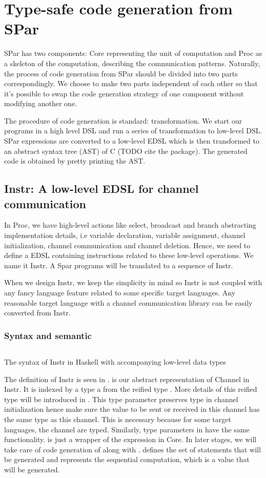 \chapter{Type-safe code generation from SPar} \label{chap:cg}
SPar has two components: Core representing the unit of computation and Proc as a skeleton of the computation, describing the communication patterns. Naturally, the process of code generation from SPar should be divided into two parts correspondingly. We choose to make two parts independent of each other so that it's possible to swap the code generation strategy of one component without modifying another one.

The procedure of code generation is standard: transformation. We start our programs in a high level DSL and run a series of transformation to low-level DSL. SPar expressions are converted to a low-level EDSL which is then transformed to an abstract syntax tree (AST) of C (TODO cite the package). The generated code is obtained by pretty printing the AST.
\section{Instr: A low-level EDSL for channel communication}
In Proc, we have high-level actions like select, broadcast and branch abstracting implementation details, i.e variable declaration, variable assignment, channel initialization, channel communication and channel deletion. Hence, we need to define a EDSL containing instructions related to these low-level operations. We name it Instr. A Spar programs will be translated to a sequence of Instr. 

When we design Instr, we keep the simplicity in mind so Instr is not coupled with any fancy language feature related to some specific target languages. Any reasonable target language with a channel communication library can be easily converted from Instr.
\subsection{Syntax and semantic}
\begin{listing}
    \inputminted{Haskell}{codegen/instr.hs} 
    \caption{The syntax of Instr in Haskell with accompanying low-level data types}
    \label{codegen:code:instr}
\end{listing}
The definition of Instr is seen in .  is our abstract representation of Channel in Instr. It is indexed by a type a from the reified type . More details of this reified type will be introduced in . This type parameter preserves type in channel initialization hence make sure the value to be sent or received in this channel has the same type as this channel. This is necessary because for some target languages, the channel are typed. Similarly, type parameters in  have the same functionality.  is just a wrapper of the expression in Core. In later stages, we will take care of code generation of  along with .  defines the set of statements that will be generated and  represents the sequential computation, which is a value that will be generated.

